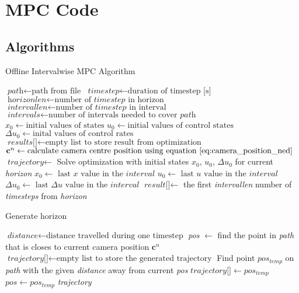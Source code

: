 \chapter{MPC Code}

\section{Algorithms}
\label{sec:appendix_algorithms}

\begin{algorithm}
\caption{Offline Intervalwise MPC Algorithm}
\label{alg:mpc}
\begin{algorithmic}
	\State $\textit{path} \gets \text{path from file}$
	\State $\textit{timestep} \gets \text{duration of timestep [s]}$
	\State $\textit{horizonlen} \gets \text{number of } \textit{timestep} \text{ in horizon}$
	\State $\textit{intervallen} \gets \text{number of } \textit{timestep} \text{ in interval}$
	\State $\textit{intervals} \gets \text{number of intervals needed to cover } \textit{path}$
	\State $\textit{x}_0 \gets \text{initial values of states}$
	\State $\textit{u}_0 \gets \text{initial values of control states}$
	\State $\Delta\textit{u}_0 \gets \text{inital values of control rates}$
	\State $\textit{results[]} \gets \text{empty list to store result from optimization}$
		\State $\mathbf{c}^n \gets \text{calculate camera centre position using equation } \ref{eq:camera_position_ned}$
		\State $\textit{trajectory} \gets$ 
		\State Solve optimization with initial states $x_0$, $u_0$, $\Delta u_0$ for current \textit{horizon}
		\State $\textit{x}_0 \gets \text{ last } \textit{x} \text{ value in the } \textit{interval}$
		\State $\textit{u}_0 \gets \text{ last } \textit{u} \text{ value in the } \textit{interval}$
		\State $\Delta\textit{u}_0 \gets \text{ last } \Delta\textit{u} \text{ value in the } \textit{interval}$
		\State $\textit{result[]} \gets$ the first \textit{intervallen} number of \textit{timesteps} from \textit{horizon}
	\EndFor
\EndProcedure
\end{algorithmic}
\end{algorithm}

\begin{algorithm}
\caption{Generate horizon}
\label{alg:genHor}
\begin{algorithmic}
	\State $\textit{distance} \gets \text{distance travelled during one timestep}$
	\State \textit{pos} $\gets$ find the point in \textit{path} that is closes to current camera position $\mathbf{c}^n$
	\State $\textit{trajectory[]} \gets \text{empty list to store the generated trajectory}$
		\State Find point \textit{$pos_{temp}$} on \textit{path} with the given \textit{distance} away from current \textit{pos}
		\State $\textit{trajectory[]} \gets pos_{temp}$
		\State $pos \gets pos_{temp}$
	\EndFor
	\Return \textit{trajectory}
\EndProcedure
\end{algorithmic}
\end{algorithm}


